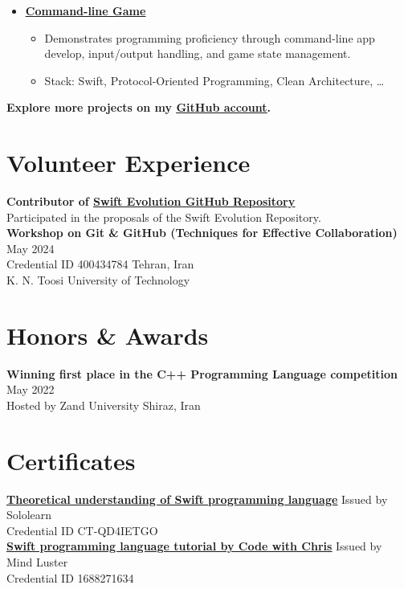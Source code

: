 \documentclass[letter,12pt]{article}
\newcommand{\customsquare}{\raisebox{0.25ex}{\scalebox{0.45}{$\blacksquare$}}}
\begin{document}
\begin{itemize}[label={\customsquare}]
    \item \href{https://github.com/nsswifter/CommandLineGameh}{\underline{\textbf{Command-line Game}}}
    \begin{itemize}
        \item Demonstrates programming proficiency through command-line app develop, input/output handling, and game state management.
        \item Stack: Swift, Protocol-Oriented Programming, Clean Architecture, …
    \end{itemize}
\end{itemize}

\small \textbf{Explore more projects on my \href{https://github.com/nsswifter}{\underline{GitHub account}}.}

\section*{Volunteer Experience}
\textbf{Contributor of \href{https://github.com/swiftlang/swift-evolution}{\underline{\textbf{Swift Evolution GitHub Repository}}}} \\ [5pt]
Participated in the proposals of the Swift Evolution Repository. \\ [15pt]
\textbf{Workshop on Git \& GitHub (Techniques for Effective Collaboration)} \hfill May 2024 \\ [5pt]
Credential ID 400434784 \hfill Tehran, Iran \\ [5pt]
K. N. Toosi University of Technology

\pagebreak

\section*{Honors \& Awards}
\noindent
\textbf{Winning first place in the C++ Programming Language competition} \hfill May 2022 \\ [5pt]
Hosted by Zand University \hfill Shiraz, Iran

\vspace{5mm} %

\section*{Certificates}
\noindent
\href{https://www.sololearn.com/certificate/CT-QD4IETGO/png}{\underline{\textbf{Theoretical understanding of Swift programming language}}} \hfill Issued by Sololearn \\ [5pt]
Credential ID CT-QD4IETGO \\ [15pt]
\href{https://www.mindluster.com/storage/cer/1688271634.jpg}{\underline{\textbf{Swift programming language tutorial by Code with Chris}}} \hfill Issued by Mind Luster \\ [5pt]
Credential ID 1688271634
\end{document}
